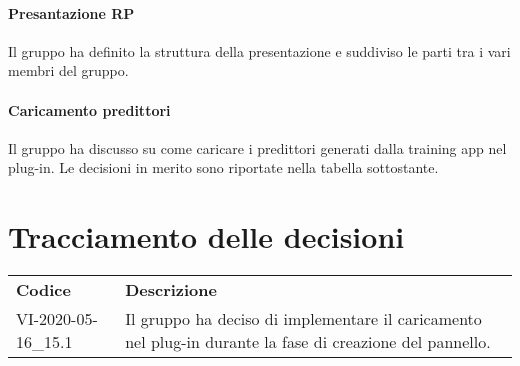 \documentclass{article}
\begin{document}
\paragraph*{Presantazione RP}
Il gruppo ha definito la struttura della presentazione e suddiviso le parti tra i vari membri del gruppo.
\paragraph*{Caricamento predittori}
Il gruppo ha discusso su come caricare i predittori generati dalla training app nel plug-in. Le decisioni in merito sono riportate nella tabella sottostante.


\section{Tracciamento delle decisioni}
\begin{table}[H]
  \centering
  \begin{tabular}{p{4cm}|p{12cm}}
    \rowcolor{lightgray}
    \textbf{Codice}  & \textbf{Descrizione}      \\
    VI-2020-05-16\_15.1 & Il gruppo ha deciso di implementare il caricamento nel plug-in durante la fase di creazione del pannello. \\
  \end{tabular}
\end{table}
\end{document}
